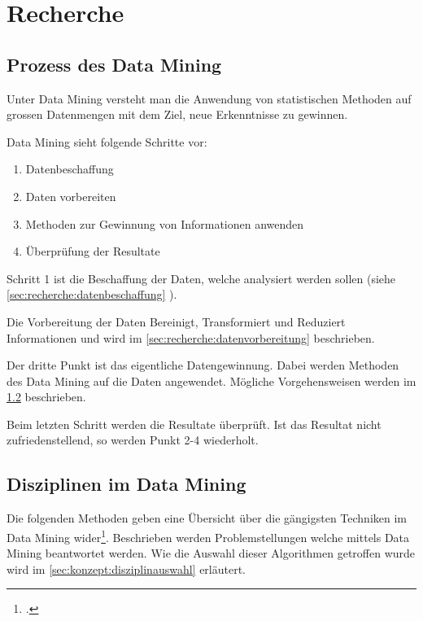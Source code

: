 \chapter{Recherche}
\label{sec:recherche}

\section{Prozess des Data Mining}
\label{sec:recherche:dataminingtechniken}
Unter Data Mining versteht man die Anwendung von statistischen Methoden auf grossen Datenmengen mit dem Ziel, neue Erkenntnisse zu gewinnen.

Data Mining sieht folgende Schritte vor:
\begin{enumerate}
	\item Datenbeschaffung
	\item Daten vorbereiten
	\item Methoden zur Gewinnung von Informationen anwenden
	\item Überprüfung der Resultate
\end{enumerate}

Schritt 1 ist die Beschaffung der Daten, welche analysiert werden sollen (siehe \cref{sec:recherche:datenbeschaffung} ). 

Die Vorbereitung der Daten Bereinigt, Transformiert und Reduziert Informationen und wird im \cref{sec:recherche:datenvorbereitung}  beschrieben.

Der dritte Punkt ist das eigentliche Datengewinnung. Dabei werden Methoden des Data Mining auf die Daten angewendet. Mögliche Vorgehensweisen werden im \cref{sec:recherche:dataminingtechniken:disziplinen}  beschrieben.

Beim letzten Schritt werden die Resultate überprüft. Ist das Resultat nicht zufriedenstellend, so werden Punkt 2-4 wiederholt.

\section{Disziplinen im Data Mining}
\label{sec:recherche:dataminingtechniken:disziplinen}
Die folgenden Methoden geben eine Übersicht über die gängigsten Techniken im Data Mining wider\footcite{top_10_algorithms}. Beschrieben werden Problemstellungen welche mittels Data Mining beantwortet werden. Wie die Auswahl dieser Algorithmen getroffen wurde wird im \cref{sec:konzept:disziplinauswahl}  erläutert.

